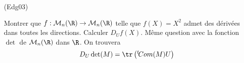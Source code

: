 \begin{tiny}(Edg03)\end{tiny}
Montrer que $f:\mathcal{M}_{n}(\R) \rightarrow \mathcal{M}_{n}(\R)$ telle que $f(X)=X^{2}$ admet des d{\'e}riv{\'e}es
dans toutes les directions. Calculer $D_{U}f(X)$.\newline
Même question avec la fonction $\det$ de $\mathcal{M}_{n}(\R)$ dans $\R$. On trouvera
\begin{displaymath}
 D_U \det (M) = \tr\left(  \mathstrut^t\!Com(M)U\right) 
\end{displaymath}
